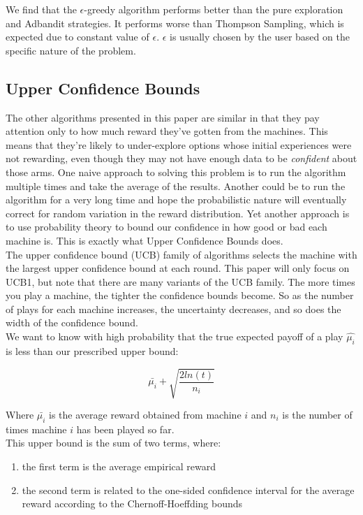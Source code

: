 \documentclass{article}
\begin{document}
We find that the $\epsilon$-greedy algorithm performs better than the pure exploration and Adbandit strategies. It performs worse than Thompson Sampling, which is expected due to constant value of $\epsilon$. $\epsilon$ is usually chosen by the user based on the specific nature of the problem.


\subsection{Upper Confidence Bounds}

The other algorithms presented in this paper are similar in that they pay attention only to how much reward they've gotten from the machines. This means that they're likely to under-explore options whose initial experiences were not rewarding, even though they may not have enough data to be \textit{confident} about those arms. One naive approach to solving this problem is to run the algorithm multiple times and take the average of the results. Another could be to run the algorithm for a very long time and hope the probabilistic nature will eventually correct for random variation in the reward distribution. Yet another approach is to use probability theory to bound our confidence in how good or bad each machine is. This is exactly what Upper Confidence Bounds does.\\

The upper confidence bound (UCB) family of algorithms selects the machine with the largest upper confidence bound at each round. This paper will only focus on UCB1, but note that there are many variants of the UCB family. The more times you play a machine, the tighter the confidence bounds become. So as the number of plays for each machine increases, the uncertainty decreases, and so does the width of the confidence bound.\\

We want to know with high probability that the true expected payoff of a play $\hat{\mu_i}$ is less than our prescribed upper bound:

$$\bar{\mu_{i}} + \sqrt{\frac{2 ln (t)}{n_i}}$$

Where $\bar{\mu_{i}}$ is the average reward obtained from machine $i$ and $n_i$ is the number of times machine $i$ has been played so far.\\

This upper bound is the sum of two terms, where:

\begin{enumerate}
\item the first term is the average empirical reward
\item the second term is related to the one-sided confidence interval for the average reward according to the Chernoff-Hoeffding bounds
\end{enumerate}
\end{document}
